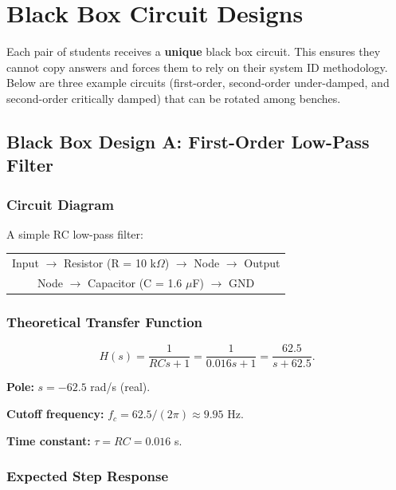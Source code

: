 \documentclass[11pt,letterpaper]{article}
\begin{document}
\section{Black Box Circuit Designs}

Each pair of students receives a \textbf{unique} black box circuit. This ensures they cannot copy answers and forces them to rely on their system ID methodology. Below are three example circuits (first-order, second-order under-damped, and second-order critically damped) that can be rotated among benches.

\subsection{Black Box Design A: First-Order Low-Pass Filter}

\subsubsection*{Circuit Diagram}

A simple RC low-pass filter:

\vspace{0.3in}
\noindent
\begin{tabular}{c}
Input $\to$ Resistor (R = 10 k$\Omega$) $\to$ Node $\to$ Output \\
Node $\to$ Capacitor (C = 1.6 $\mu$F) $\to$ GND
\end{tabular}

\vspace{0.3in}

\subsubsection*{Theoretical Transfer Function}

\begin{equation}
H(s) = \frac{1}{RCs + 1} = \frac{1}{0.016 s + 1} = \frac{62.5}{s + 62.5}.
\end{equation}

\noindent
\textbf{Pole:} $s = -62.5$ rad/s (real).

\noindent
\textbf{Cutoff frequency:} $f_c = 62.5 / (2\pi) \approx 9.95$ Hz.

\noindent
\textbf{Time constant:} $\tau = RC = 0.016$ s.

\subsubsection*{Expected Step Response}
\end{document}
